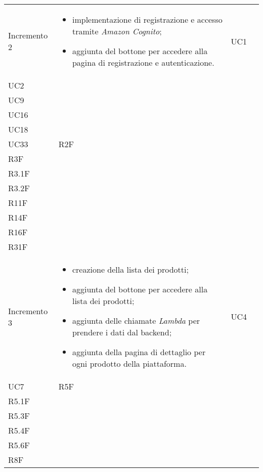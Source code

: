 \begin{longtable}{
    >{\centering}p{}
    >{\raggedright}p{}
    >{\centering}p{}
    >{\centering}p{}
    }
    Incremento 2                  &
    \vspace{-15px}
    \begin{itemize}
        \renewcommand\labelitemi{-}
        \item implementazione di registrazione e accesso tramite \textit{Amazon Cognito};
        \item aggiunta del bottone per accedere alla pagina di registrazione e autenticazione.
    \end{itemize}     & UC1                                                                                           \\ UC2 \\  UC9 \\ UC16 \\ UC18 \\ UC33                  & R2F                          \\ R3F \\ R3.1F \\ R3.2F \\
    R11F                                                                                                                          \\ R14F \\ R16F \\ R31F
    \tabularnewline

    Incremento 3                  &
    \vspace{-15px}
    \begin{itemize}
        \renewcommand\labelitemi{-}
        \item creazione della lista dei prodotti;
        \item aggiunta del bottone per accedere alla lista dei prodotti;
        \item aggiunta delle chiamate \textit{Lambda} per prendere i dati dal backend;
        \item aggiunta della pagina di dettaglio per ogni prodotto della piattaforma.
    \end{itemize}     & UC4                                                                                           \\ UC7                              & R5F                          \\ R5.1F \\ R5.3F \\ R5.4F \\ R5.6F \\ R8F
    \tabularnewline


\end{longtable}
